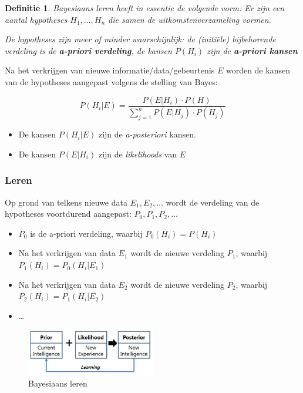 \documentclass{article}
\newtheorem{theorem}{Definitie}[section]
\begin{document}
\begin{theorem}
    Bayesiaans leren heeft in essentie de volgende vorm: Er zijn een aantal hypotheses $H_1, \dots, H_n$ die samen de uitkomstenverzameling vormen.

    De hypotheses zijn meer of minder waarschijnlijk: de (initiële) bijbehorende verdeling is de \textbf{a-priori verdeling}, de kansen
    $P(H_i)$ zijn de \textbf{a-priori kansen}
\end{theorem}

Na het verkrijgen van nieuwe informatie/data/gebeurtenis $E$ worden de kansen van de hypotheses aangepast volgens de stelling van Bayes:

\begin{equation}
    P(H_i | E) = \frac{P(E | H_i) \cdot P(H)}{\sum_{j=1}^n P(E | H_j) \cdot P(H_j)}
\end{equation}


\begin{itemize}
    \item De kansen $P(H_i | E)$ zijn de \textit{a-posteriori} kansen. 
    \item De kansen $P(E | H_i)$ zijn de \textit{likelihoods} van $E$
\end{itemize}

\subsubsection{Leren}

Op grond van telkens nieuwe data $E_1, E_2, \dots$ wordt de verdeling van de hypotheses voortdurend aangepast: $P_0, P_1, P_2, \dots$

\begin{itemize}
    \item $P_0$ is de a-priori verdeling, waarbij $P_0(H_i) = P(H_i)$
    \item Na het verkrijgen van data $E_1$ wordt de nieuwe verdeling $P_1$, waarbij $P_1(H_i) = P_0(H_i | E_1)$
    \item Na het verkrijgen van data $E_2$ wordt de nieuwe verdeling $P_2$, waarbij $P_2(H_i) = P_1(H_i | E_2)$
    \item \dots
\end{itemize}


\begin{figure}[H]
    \centering
    \includegraphics[width=0.5\textwidth]{bayesiaans-leren.png}
    \caption{Bayesiaans leren}
\end{figure}
\end{document}
